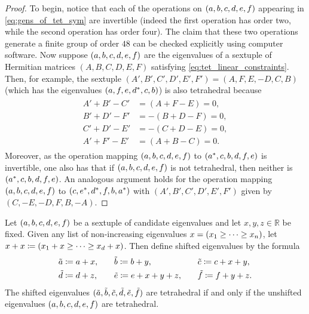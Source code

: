 \documentclass[notitlepage, 10pt]{article}
\begin{document}
\begin{proof}
    To begin, notice that each of the operations on $(a,b,c,d,e,f)$ appearing in \cref{eq:gens_of_tet_sym} are invertible (indeed the first operation has order two, while the second operation has order four).
    The claim that these two operations generate a finite group of order $48$ can be checked explicitly using computer software.
    Now suppose $(a,b,c,d,e,f)$ are the eigenvalues of a sextuple of Hermitian matrices $(A,B,C,D,E,F)$ satisfying \cref{eq:tet_linear_constraints}.
    Then, for example, the sextuple $(A',B',C',D',E',F') = (A,F,E,-D,C,B)$ (which has the eigenvalues $(a, f, e, d^{*}, c, b)$) is also tetrahedral because
    \begin{align}
        \label{eq:signed_perm_rows}
        \begin{split}
            A'+B'-C' &= (A+F-E) = 0,  \\
            B'+D'-F' &= -(B+D-F) = 0, \\
            C'+D'-E' &= -(C+D-E) = 0, \\
            A'+F'-E' &= (A+B-C) = 0.
        \end{split}
    \end{align}
    Moreover, as the operation mapping $(a,b,c,d,e,f)$ to $(a^*, c, b, d, f, e)$ is invertible, one also has that if $(a,b,c,d,e,f)$ is not tetrahedral, then neither is $(a^*, c, b, d, f, e)$.
    An analogous argument holds for the operation mapping $(a,b,c,d,e,f)$ to $(c, e^*, d^{*}, f, b, a^*)$ with $(A',B',C',D',E',F')$ given by $(C,-E,-D,F,B,-A)$.
\end{proof}
\begin{prop}
    \label{prop:shifting}
    Let $(a, b, c, d, e, f)$ be a sextuple of candidate eigenvalues and let $x,y,z \in \mathbb R$ be fixed.
    Given any list of non-increasing eigenvalues $x = (x_1 \geq \cdots \geq x_n)$, let $x + x \coloneqq (x_1 + x \geq \cdots \geq x_d + x)$.
    Then define shifted eigenvalues by the formula
    \begin{equation}
        \label{eq:shifted_tet_eigenvalues}
        \begin{alignedat}{3}
             &\tilde {a}     \coloneqq a + x, \qquad
            &&\tilde {b}      \coloneqq b + y, \qquad
            &&\tilde {c}     \coloneqq c + x + y, \\
             &\tilde {d}     \coloneqq d + z, \qquad
            &&\tilde {e}   \coloneqq e + x + y + z, \qquad
            &&\tilde {f}       \coloneqq f + y + z.
        \end{alignedat}
    \end{equation}
    The shifted eigenvalues $(\tilde {a}, \tilde {b}, \tilde {c}, \tilde {d}, \tilde {e},\tilde {f})$ are tetrahedral if and only if the unshifted eigenvalues $(a, b, c, d, e, f)$ are tetrahedral.
\end{prop}
\end{document}
